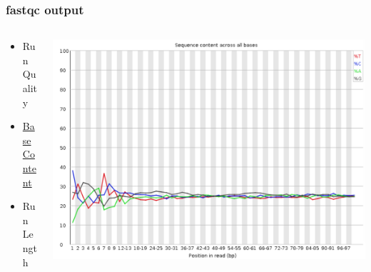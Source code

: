 \documentclass[14pt,handout]{beamer}
\begin{document}
\begin{frame}
\frametitle{fastqc output}
\begin{columns}
	\begin{column}{0.35\textwidth}
		\begin{itemize}
			\item<+-> Run Quality
			\item<+-> \underline{Base Content}
			\item<+-> Run Length
		\end{itemize}
		\end{column}
	\begin{column}{0.65\textwidth}
		\begin{center}
     		\includegraphics[width=1\textwidth]{images_20171012_base_content.png}
     	\end{center}
	\end{column}
\end{columns}
\end{frame}
\end{document}
